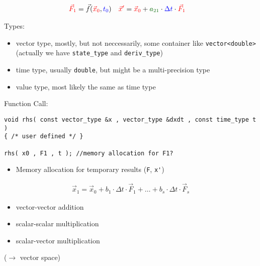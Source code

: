 \begin{frame}[fragile]
\begin{align*}
 {\color{red}\vec F_1} &= \vec f( {\color{red}\vec x_0} , {\color{blue}t_0} ) & %
 {\color{red}\vec x'} &= {\color{red}\vec x_0} + {\color{dark-green}a_{21}} \cdot {\color{blue}\Delta t} \cdot {\color{red}\vec F_1}
\end{align*}
 
Types:
\begin{itemize}
 \item {\color{red} vector type}, mostly, but not neccessarily, some container like \lstinline+vector<double>+ {\scriptsize (actually we have \lstinline+state_type+ and \lstinline+deriv_type+)}
 \item {\color{blue} time type}, usually \lstinline+double+, but might be a multi-precision type
 \item {\color{dark-green} value type}, most likely the same as time type
\end{itemize}
\pause
\vspace{0.5em}

Function Call:
\begin{lstlisting}
void rhs( const vector_type &x , vector_type &dxdt , const time_type t )
{ /* user defined */ }

rhs( x0 , F1 , t ); //memory allocation for F1?
\end{lstlisting}
\begin{itemize}
 \item Memory allocation for temporary results (\lstinline+F+, \lstinline+x'+)
\end{itemize}

\end{frame}


\begin{frame}
\begin{align*}
  \vec x_1 = \vec x_0 + b_1\cdot \Delta t \cdot \vec F_1 + \dots + b_s\cdot \Delta t \cdot \vec F_s
\end{align*}

\begin{itemize}
 \item vector-vector addition
 \item scalar-scalar multiplication
 \item scalar-vector multiplication
\end{itemize}
\centerline{\small ($\longrightarrow$ vector space)}

\end{frame}

